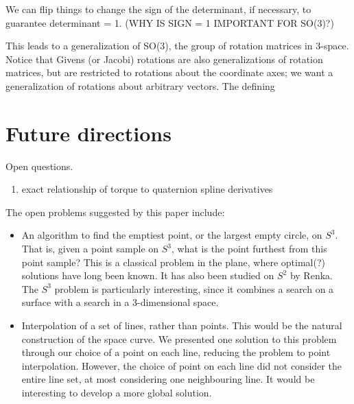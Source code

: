 \documentclass[12pt]{article}
\begin{document}
We can flip things to change the sign of the determinant, if necessary, to guarantee determinant = 1.  (WHY IS SIGN = 1 IMPORTANT FOR SO(3)?)

This leads to a generalization of SO(3), the group of rotation matrices in 3-space.
Notice that Givens (or Jacobi) rotations \cite{golubvanLoan} are also generalizations
of rotation matrices, but are restricted to rotations about the coordinate axes;
we want a generalization of rotations about arbitrary vectors.
The defining 

\clearpage

\section{Future directions}
\label{sec:future}

Open questions.
\begin{enumerate}
\item exact relationship of torque to quaternion spline derivatives
\end{enumerate}

The open problems suggested by this paper include:

\begin{itemize}
\item An algorithm to find the emptiest point, or the largest empty circle, on $S^3$.
      That is, given a point sample on $S^3$, what is the point furthest from this point
      sample?  This is a classical problem in the plane, where optimal(?) 
      solutions have long been known.  It has also been studied on $S^2$ by Renka.
      The $S^3$ problem is particularly interesting, since it combines a search on
      a surface with a search in a 3-dimensional space.
\item Interpolation of a set of lines, rather than points.
      This would be the natural construction of the space curve.
      We presented one solution to this problem through our choice of a point on each line,
      reducing the problem to point interpolation.
      However, the choice of point on each line did not consider the entire line set,
      at most considering one neighbouring line.
      It would be interesting to develop a more global solution.
\end{itemize}
\end{document}
